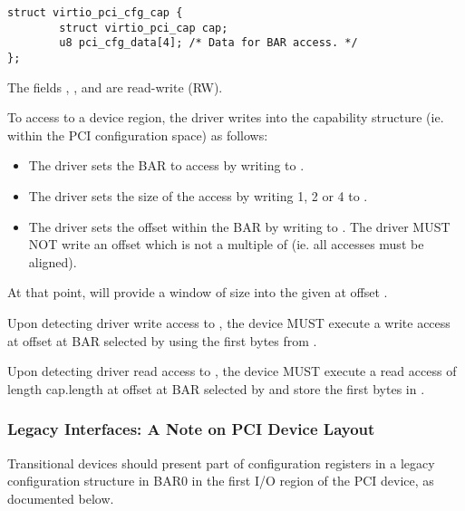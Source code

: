 \begin{lstlisting}
struct virtio_pci_cfg_cap {
        struct virtio_pci_cap cap;
        u8 pci_cfg_data[4]; /* Data for BAR access. */
};
\end{lstlisting}

The fields , ,  and 
are read-write (RW).

To access to a device region, the driver writes into the capability
structure (ie. within the PCI configuration space) as follows:

\begin{itemize}
\item The driver sets the BAR to access by writing to .

\item The driver sets the size of the access by writing 1, 2 or 4 to
  .

\item The driver sets the offset within the BAR by writing to
  .  The driver MUST NOT write an offset which is not
  a multiple of  (ie. all accesses must be aligned).
\end{itemize}

At that point,  will provide a window of size
 into the given  at offset .

Upon detecting driver write access
to , the device MUST execute a write access
at offset  at BAR selected by  using the first 
bytes from .

Upon detecting driver read access
to , the device MUST
execute a read access of length cap.length at offset 
at BAR selected by  and store the first  bytes in
.

\subsubsection{Legacy Interfaces: A Note on PCI Device Layout}\label{sec:Virtio Transport Options / Virtio Over PCI Bus / PCI Device Layout / Legacy Interfaces: A Note on PCI Device Layout}

Transitional devices should present part of configuration
registers in a legacy configuration structure in BAR0 in the first I/O
region of the PCI device, as documented below.

